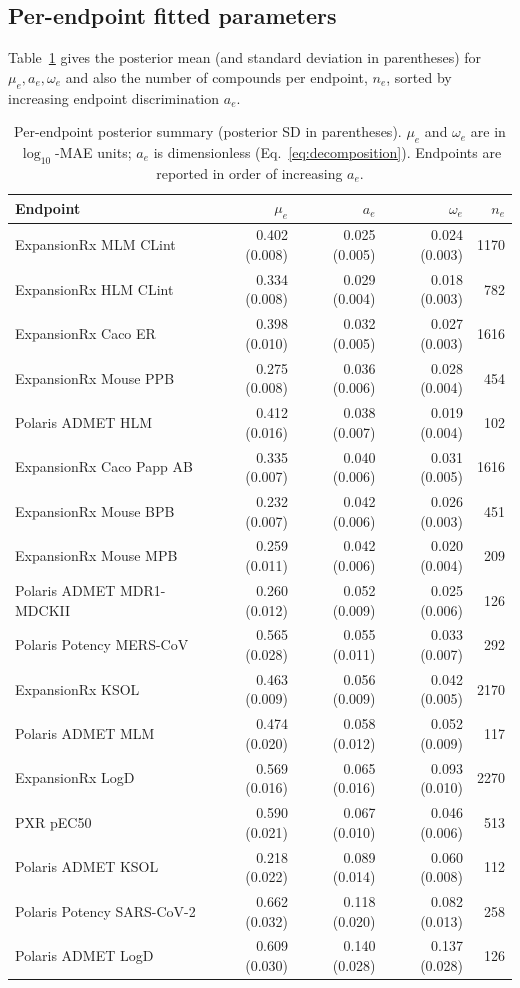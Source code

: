 \documentclass{article}
\begin{document}
\subsection{Per-endpoint fitted parameters}
Table~\ref{tab:endpoint-summary} gives the posterior mean (and standard deviation in parentheses) for $\mu_e, a_e, \omega_e$ and also the number of compounds per endpoint, $n_e$, sorted by increasing endpoint discrimination $a_e$.

\begin{table}[H]
\centering
\small
\caption{Per-endpoint posterior summary (posterior SD in parentheses). $\mu_e$ and $\omega_e$ are in $\log_{10}$-MAE units; $a_e$ is dimensionless (Eq.~\ref{eq:decomposition}). 
Endpoints are reported in order of increasing $a_e$.}
\label{tab:endpoint-summary}
\begin{tabular}{lrrrr}
\toprule
Endpoint & $\mu_e$ & $a_e$ & $\omega_e$ & $n_e$ \\
\midrule
ExpansionRx MLM CLint & 0.402 (0.008) & 0.025 (0.005) & 0.024 (0.003) & 1170 \\
ExpansionRx HLM CLint & 0.334 (0.008) & 0.029 (0.004) & 0.018 (0.003) & 782 \\
ExpansionRx Caco ER & 0.398 (0.010) & 0.032 (0.005) & 0.027 (0.003) & 1616 \\
ExpansionRx Mouse PPB & 0.275 (0.008) & 0.036 (0.006) & 0.028 (0.004) & 454 \\
Polaris ADMET HLM & 0.412 (0.016) & 0.038 (0.007) & 0.019 (0.004) & 102 \\
ExpansionRx Caco Papp AB & 0.335 (0.007) & 0.040 (0.006) & 0.031 (0.005) & 1616 \\
ExpansionRx Mouse BPB & 0.232 (0.007) & 0.042 (0.006) & 0.026 (0.003) & 451 \\
ExpansionRx Mouse MPB & 0.259 (0.011) & 0.042 (0.006) & 0.020 (0.004) & 209 \\
Polaris ADMET MDR1-MDCKII & 0.260 (0.012) & 0.052 (0.009) & 0.025 (0.006) & 126 \\
Polaris Potency MERS-CoV & 0.565 (0.028) & 0.055 (0.011) & 0.033 (0.007) & 292 \\
ExpansionRx KSOL & 0.463 (0.009) & 0.056 (0.009) & 0.042 (0.005) & 2170 \\
Polaris ADMET MLM & 0.474 (0.020) & 0.058 (0.012) & 0.052 (0.009) & 117 \\
ExpansionRx LogD & 0.569 (0.016) & 0.065 (0.016) & 0.093 (0.010) & 2270 \\
PXR pEC50 & 0.590 (0.021) & 0.067 (0.010) & 0.046 (0.006) & 513 \\
Polaris ADMET KSOL & 0.218 (0.022) & 0.089 (0.014) & 0.060 (0.008) & 112 \\
Polaris Potency SARS-CoV-2 & 0.662 (0.032) & 0.118 (0.020) & 0.082 (0.013) & 258 \\
Polaris ADMET LogD & 0.609 (0.030) & 0.140 (0.028) & 0.137 (0.028) & 126 \\
\bottomrule
\end{tabular}
\end{table}
\end{document}

